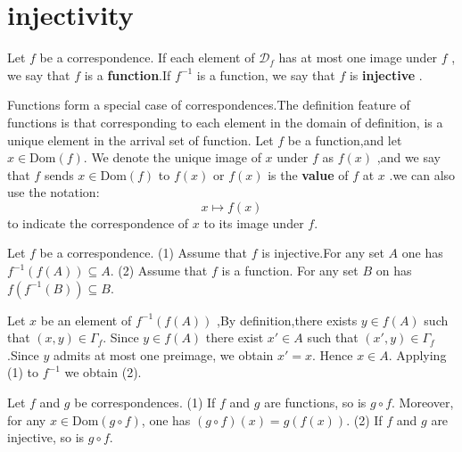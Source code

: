 \documentclass{book}
\numberwithin{equation}{section}
\begin{document}
\section{injectivity}
\begin{definitionenv}
    Let $f$ be a correspondence. If each element of $\mathscr{D}_f$ has at most one image under $f$ , we say that $f$ is a \textbf{function}.If $f^{-1}$ is a function, we say that $f$ is \textbf{injective} .
\end{definitionenv}
\begin{notationenv}
    Functions form a special case of correspondences.The definition feature of functions is that corresponding to each element in the domain of definition, is a unique element in the arrival set of function.
    \newline
    Let $f$ be a function,and let $x\in \mathrm{Dom}(f)$. We denote the unique image of $x$ under $f$ as $f(x)$ ,and we say that $f$ sends $x\in \mathrm{Dom}(f)$ to $f(x)$ or $f(x)$  is the \textbf{value} of $f$ at $x$ .we can also use the notation:
    $$x\mapsto f(x)$$
    to indicate the correspondence of $x$ to its image under $f$.
\end{notationenv}
\begin{propositionenv}\label{proposition3.6.1}
    Let $f$ be a correspondence.
    \newline
    (1) Assume that $f$ is injective.For any set $A$ one has $f^{-1}(f(A))\subseteq A$.
    \newline
    (2) Assume that $f$ is a function. For any set $B$ on has $f(f^{-1}(B))\subseteq B$. 
\end{propositionenv}
\begin{proofenv}
    Let $x$ be an element of $f^{-1}(f(A))$ ,By definition,there exists $y\in f(A)$ such that $(x,y)\in \Gamma_f$. Since $y\in f(A) $ there exist $x'\in A$ such that $(x',y)\in \Gamma_f$.Since $y$ admits at most one preimage, we obtain $x'=x$. Hence $x\in A$.
    \newline
    Applying (1) to $f^{-1}$ we obtain (2).
\end{proofenv}
\begin{propositionenv}\label{proposition3.6.2}
    Let \( f \) and \( g \) be correspondences.
\newline
    (1) If \( f \) and \( g \) are functions, so is \( g \circ f \). Moreover, for any \( x \in \text{Dom}(g \circ f) \), one has \((g \circ f)(x) = g(f(x))\).
    \newline
    (2) If \( f \) and \( g \) are injective, so is \( g \circ f \).

\end{propositionenv}
\end{document}
